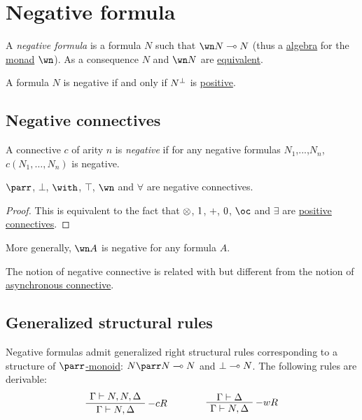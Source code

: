 \section{Negative formula}\label{negative-formula}

A \emph{negative formula} is a formula \(N\) such that \(\wn N\limp N\)
(thus a \href{https://en.wikipedia.org/wiki/F-algebra}{algebra} for the
\href{https://en.wikipedia.org/wiki/Monad_(category_theory)}{monad} \(\wn\)). As a consequence \(N\) and \(\wn N\) are \hyperref[equivalences]{equivalent}.

A formula \(N\) is negative if and only if \(N^\bot\) is \hyperref[positive-formula]{positive}.

\subsection{Negative connectives}\label{negative-connectives}

A connective \(c\) of arity \(n\) is \emph{negative} if for any negative
formulas \(N_1\),...,\(N_n\), \(c(N_1,\dots,N_n)\) is negative.

\begin{proposition}
$\parr$, $\bot$, $\with$, $\top$, $\wn$ and $\forall$ are negative connectives.
\end{proposition}

\begin{proof}
This is equivalent to the fact that $\otimes$, $1$, $\plus$, $0$, $\oc$ and $\exists$ are \hyperref[positive-formula]{positive connectives}.
\end{proof}

More generally, \(\wn A\) is negative for any formula \(A\).

The notion of negative connective is related with but different from the
notion of \hyperref[asynchrony]{asynchronous connective}.

\subsection{Generalized structural rules}\label{generalized-structural-rules}

Negative formulas admit generalized right structural rules corresponding
to a structure of
\href{https://en.wikipedia.org/wiki/Monoid_(category_theory)}{\(\parr\)-monoid}:
\(N\parr N\limp N\) and \(\bot\multimap N\).
The following rules are derivable:
\begin{equation*}
\AxRule{\Gamma\vdash N,N,\Delta}
\LabelRule{- c R}
\UnaRule{\Gamma\vdash N,\Delta}
\DisplayProof
\qquad\qquad
\AxRule{\Gamma\vdash\Delta}
\LabelRule{- w R}
\UnaRule{\Gamma\vdash N,\Delta}
\DisplayProof
\end{equation*}

